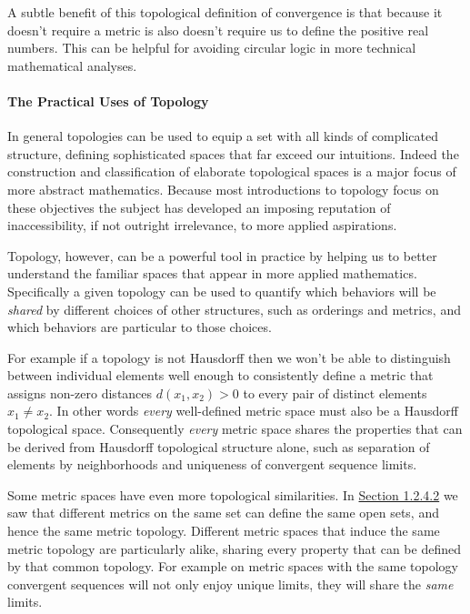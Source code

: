 \documentclass[
  letterpaper,
  DIV=11,
  numbers=noendperiod]{scrartcl}
\let\oldparagraph\paragraph
\renewcommand{\paragraph}[1]{\oldparagraph{#1}\mbox{}}
\begin{document}
A subtle benefit of this topological definition of convergence is that
because it doesn't require a metric is also doesn't require us to define
the positive real numbers. This can be helpful for avoiding circular
logic in more technical mathematical analyses.

\hypertarget{the-practical-uses-of-topology}{%
\paragraph{The Practical Uses of
Topology}\label{the-practical-uses-of-topology}}

In general topologies can be used to equip a set with all kinds of
complicated structure, defining sophisticated spaces that far exceed our
intuitions. Indeed the construction and classification of elaborate
topological spaces is a major focus of more abstract mathematics.
Because most introductions to topology focus on these objectives the
subject has developed an imposing reputation of inaccessibility, if not
outright irrelevance, to more applied aspirations.

Topology, however, can be a powerful tool in practice by helping us to
better understand the familiar spaces that appear in more applied
mathematics. Specifically a given topology can be used to quantify which
behaviors will be \emph{shared} by different choices of other
structures, such as orderings and metrics, and which behaviors are
particular to those choices.

For example if a topology is not Hausdorff then we won't be able to
distinguish between individual elements well enough to consistently
define a metric that assigns non-zero distances \(d(x_{1}, x_{2}) > 0\)
to every pair of distinct elements \(x_{1} \ne x_{2}\). In other words
\emph{every} well-defined metric space must also be a Hausdorff
topological space. Consequently \emph{every} metric space shares the
properties that can be derived from Hausdorff topological structure
alone, such as separation of elements by neighborhoods and uniqueness of
convergent sequence limits.

Some metric spaces have even more topological similarities. In
\href{@sec:open-sets}{Section 1.2.4.2} we saw that different metrics on
the same set can define the same open sets, and hence the same metric
topology. Different metric spaces that induce the same metric topology
are particularly alike, sharing every property that can be defined by
that common topology. For example on metric spaces with the same
topology convergent sequences will not only enjoy unique limits, they
will share the \emph{same} limits.
\end{document}
